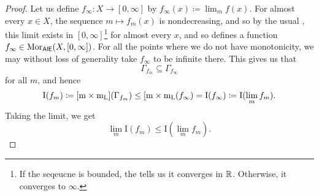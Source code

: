 \begin{thm}[Integral]
\begin{proof}
Let us define $f_\infty :X\rightarrow [0,\infty ]$ by $f_\infty (x)\coloneqq \lim _mf(x)$.  For almost every $x\in X$, the sequence $m\mapsto f_m(x)$ is nondecreasing, and so by the usual , this limit exists in $[0,\infty ]$\footnote{If the seqeucne is bounded, the  tells us it converges in $\mathbb{R}$.  Otherwise, it converges to $\infty$.} for almost every $x$, and so defines a function $f_\infty \in \operatorname{Mor} _{\mathsf{AlE}}(X,[0,\infty ])$.  For all the points where we do not have monotonicity, we may without loss of generality take $f_\infty$ to be infinite there.  This gives us that
\begin{equation}
\Gamma _{f_m}\subseteq \Gamma _{f_\infty}
\end{equation}
for all $m$, and hence
\begin{equation}
\mathrm{I}(f_m)\coloneqq [\mathrm{m} \times \mathrm{m}_{\mathrm{L}}](\Gamma _{f_m})\leq [\mathrm{m} \times \mathrm{m} _{\mathrm{L}}(f_\infty)=\mathrm{I}(f_\infty )\coloneqq \mathrm{I}(\lim _mf_m).
\end{equation}
Taking the limit, we get
\begin{equation}
\lim _m\mathrm{I}(f_m)\leq \mathrm{I}(\lim _mf_m).
\end{equation}


\end{proof}
\end{thm}